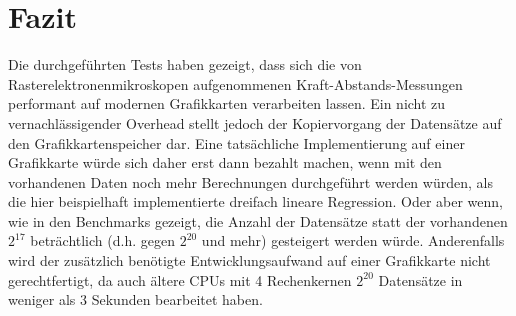 %
%
%    
%
%
%    


\chapter{Fazit}
Die durchgeführten Tests haben gezeigt, dass sich die von Rasterelektronenmikroskopen aufgenommenen Kraft-Abstands-Messungen performant auf modernen Grafikkarten verarbeiten lassen.
Ein nicht zu vernachlässigender Overhead stellt jedoch der Kopiervorgang der Datensätze auf den Grafikkartenspeicher dar. Eine tatsächliche Implementierung auf einer Grafikkarte würde sich daher erst dann bezahlt machen, wenn mit den vorhandenen Daten noch mehr Berechnungen durchgeführt werden würden, als die hier beispielhaft implementierte dreifach lineare Regression. Oder aber wenn, wie in den Benchmarks gezeigt, die Anzahl der Datensätze statt der vorhandenen $2^{17}$ beträchtlich (d.h. gegen $2^{20}$ und mehr) gesteigert werden würde.
Anderenfalls wird der zusätzlich benötigte Entwicklungsaufwand auf einer Grafikkarte nicht gerechtfertigt, da auch ältere CPUs mit 4 Rechenkernen $2^{20}$ Datensätze in weniger als 3 Sekunden bearbeitet haben.